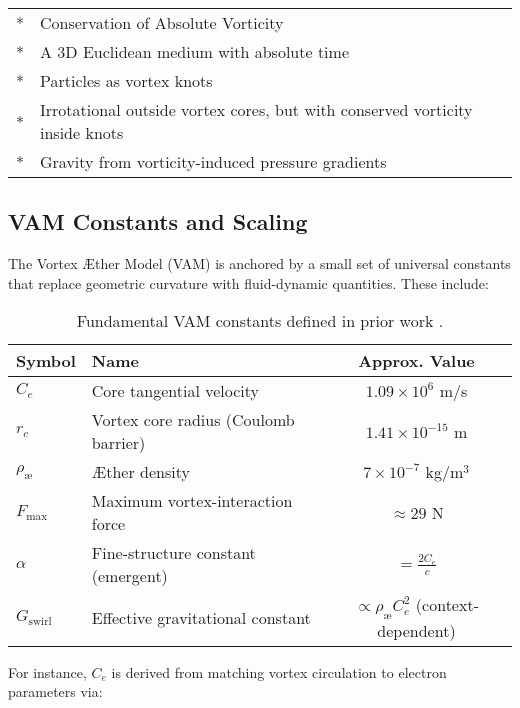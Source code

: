 \documentclass[aps,preprint,superscriptaddress]{revtex4}
\begin{document}
    \begin{tabular}{ll}
        \toprule
        \midrule
            * & Conservation of Absolute Vorticity \\
            * & A 3D Euclidean medium with absolute time \\
            * & Particles as vortex knots \\
            * & Irrotational outside vortex cores, but with conserved vorticity inside knots \\
            * & Gravity from vorticity-induced pressure gradients \\
        \bottomrule
    \end{tabular}

    \subsection*{VAM Constants and Scaling}

    The Vortex Æther Model (VAM) is anchored by a small set of universal constants that replace geometric curvature with fluid-dynamic quantities. These include:

    \begin{table}[h!]
        \centering
        \begin{tabular}{llc}
            \hline
            \textbf{Symbol} & \textbf{Name} & \textbf{Approx. Value} \\
            \hline
            $C_e$ & Core tangential velocity & $1.09 \times 10^6$ m/s \\
            $r_c$ & Vortex core radius (Coulomb barrier) & $1.41 \times 10^{-15}$ m \\
            $\rho_{\text{\ae}}$ & Æther density & $7 \times 10^{-7}$ kg/m$^3$ \\
            $F_{\max}$ & Maximum vortex-interaction force & $\approx 29$ N \\
            $\alpha$ & Fine-structure constant (emergent) & $= \frac{2 C_e}{c}$ \\
            $G_{\text{swirl}}$ & Effective gravitational constant & $ \propto \rho_{\text{\ae}} C_e^2$ (context-dependent) \\
            \hline
        \end{tabular}
        \caption{Fundamental VAM constants defined in prior work \cite{vam2025field, vam2025unified}.}\label{tab:table}
    \end{table}

    For instance, $C_e$ is derived from matching vortex circulation to electron parameters via:
\end{document}
